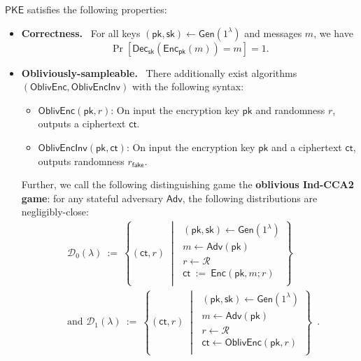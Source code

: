 \documentclass[11pt,letterpaper]{article}
\renewcommand{\emph}[1]{\textbf{#1}~}
\theoremstyle{plain} %
\theoremstyle{definition} %
\theoremstyle{remark} %
\newcommand{\eqdef}{\ {:=} \ }
\newcommand{\SecParam}{\lambda}
\newcommand{\PKE}{\mathsf{PKE}}
\newcommand{\Gen}{\mathsf{Gen}}
\newcommand{\Enc}{\mathsf{Enc}}
\newcommand{\OblivEnc}{\mathsf{OblivEnc}}
\newcommand{\OblivEncInv}{\mathsf{OblivEncInv}}
\newcommand{\Dec}{\mathsf{Dec}}
\newcommand{\EncKey}{\mathsf{pk}}
\newcommand{\DecKey}{\mathsf{sk}}
\newcommand{\Msg}{m}
\newcommand{\Ct}{\mathsf{ct}}
\newcommand{\Rand}{r}
\newcommand{\FakeRand}{r_{\mathsf{fake}}}
\newcommand{\Distribution}{\mathcal{D}}
\newcommand{\RandSpace}{\mathcal{R}}
\newcommand{\Adversary}{{\mathsf{Adv}}} %
\newcommand{\pST}{\; \middle| \;}
\begin{document}
$\PKE$ satisfies the following properties:
\begin{itemize}
    \item \emph{Correctness.} For all keys $(\EncKey, \DecKey) \gets \Gen(1^{\SecParam})$ and messages $\Msg$, we have
    \[ \Pr[ \Dec_{\DecKey} (\Enc_{\EncKey} (\Msg)) = \Msg ] = 1. \]

    \item \emph{Obliviously-sampleable.} There additionally exist algorithms $(\OblivEnc, \OblivEncInv)$ with the following syntax:
    \begin{itemize}
    	\item $\OblivEnc(\EncKey,\Rand)$: On input the encryption key $\EncKey$ and randomness $\Rand$, outputs a ciphertext $\Ct$.
    	\item $\OblivEncInv(\EncKey,\Ct)$: On input the encryption key $\EncKey$ and a ciphertext $\Ct$, outputs randomness $\FakeRand$.
    \end{itemize}

    Further, we call the following distinguishing game the \textbf{oblivious Ind-CCA2 game}: for any stateful adversary $\Adversary$, the following distributions are negligibly-close:
    \begin{align*}
		&\Distribution_0(\SecParam) \eqdef \left\{
		(\Ct,\Rand)
		\pST
		\begin{array}{r}
            (\EncKey,\DecKey)\gets \Gen(1^\SecParam)\\
			\Msg \gets \Adversary(\EncKey)\\
            \Rand \gets \RandSpace\\
			\Ct \eqdef \Enc(\EncKey,\Msg;\Rand)\\
		\end{array}
		\right\} \\
		&\text{and } \Distribution_1(\SecParam) \eqdef \left\{
		(\Ct, \Rand)
		\pST
		\begin{array}{r}
            (\EncKey,\DecKey)\gets \Gen(1^\SecParam)\\
            \Msg \gets \Adversary(\EncKey)\\
            \Rand \gets \RandSpace\\
            \Ct \gets \OblivEnc(\EncKey,\Rand)\\
		\end{array}
		\right\} \enspace.
	\end{align*}
\end{itemize}
\end{document}
